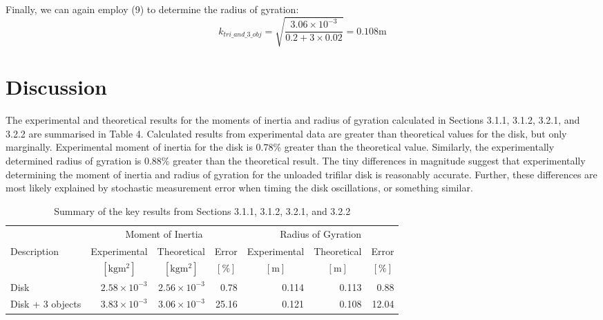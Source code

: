 \documentclass[a4paper]{article}
\begin{document}
Finally, we can again employ (9) to determine the radius of gyration:
\begin{equation}
	k_{tri\_and\_3\_obj} = \sqrt{\frac{3.06 \times 10^{-3}}{0.2 + 3 \times 0.02}} = 0.108 \si{\meter}
\end{equation}

\section{Discussion}
The experimental and theoretical results for the moments of inertia and radius of gyration calculated in Sections 3.1.1, 3.1.2, 3.2.1, and 3.2.2 are summarised in Table 4. Calculated results from experimental data are greater than theoretical values for the disk, but only marginally. Experimental moment of inertia for the disk is 0.78\% greater than the theoretical value. Similarly, the experimentally determined radius of gyration is 0.88\% greater than the theoretical result. The tiny differences in magnitude suggest that experimentally determining the moment of inertia and radius of gyration for the unloaded trifilar disk is reasonably accurate. Further, these differences are most likely explained by stochastic measurement error when timing the disk oscillations, or something similar.  
\begin{table}[h]
	\centering
	\caption{Summary of the key results from Sections 3.1.1, 3.1.2, 3.2.1, and 3.2.2}
	\begin{tabular}{lrrrrrr}
		\toprule
		& \multicolumn{3}{c}{Moment of Inertia} & \multicolumn{3}{c}{Radius of Gyration} \\
		\cmidrule(l{3pt}r{3pt}){2-4} \cmidrule(l{3pt}r{3pt}){5-7}
		Description & Experimental & Theoretical & Error & Experimental & Theoretical & Error\\
		 & \multicolumn{1}{c}{$[\si{\kilogram\meter^2}]$} & \multicolumn{1}{c}{$[\si{\kilogram\meter^2}]$} & \multicolumn{1}{c}{$[\%]$} & \multicolumn{1}{c}{$[\si{\meter}]$} & \multicolumn{1}{c}{$[\si{\meter}]$} & \multicolumn{1}{c}{$[\%]$} \\ 
		\midrule
		Disk & $2.58 \times 10^{-3}$ & $2.56 \times 10^{-3}$ & 0.78 & 0.114 & 0.113 & 0.88 \\
		Disk + 3 objects & $3.83 \times 10^{-3}$ & $3.06 \times 10^{-3}$ & 25.16 & 0.121 & 0.108 & 12.04\\
		\bottomrule
	\end{tabular}
\end{table}
\end{document}
